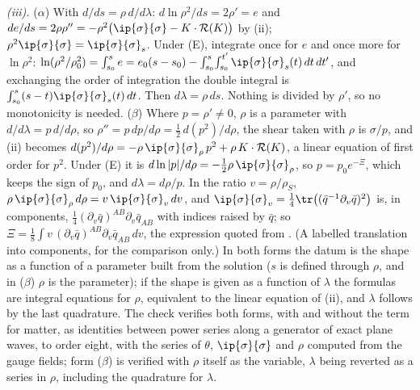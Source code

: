 \emph{(iii).} ($\alpha$) With $d/ds = \rho\,d/d\lambda$: $d\ln\rho^{2}/ds = 2\rho' = e$ and $de/ds = 2\rho\rho'' = -\rho^{2}\bigl(\ip{\sigma}{\sigma} - K \cdot \mathcal{R}(K)\bigr)$ by (ii); $\rho^{2}\ip{\sigma}{\sigma} = \ip{\sigma}{\sigma}_{s}$. Under (E), integrate once for $e$ and once more for $\ln\rho^{2}$: $\ln(\rho^{2}/\rho_{0}^{2}) = \int_{s_{0}}^{s}e = e_{0}(s - s_{0}) - \int_{s_{0}}^{s}\!\int_{s_{0}}^{t'}\ip{\sigma}{\sigma}_{s}(t)\,dt\,dt'$, and exchanging the order of integration the double integral is $\int_{s_{0}}^{s}(s - t)\ip{\sigma}{\sigma}_{s}(t)\,dt$. Then $d\lambda = \rho\,ds$. Nothing is divided by $\rho'$, so no monotonicity is needed. ($\beta$) Where $p = \rho' \neq 0$, $\rho$ is a parameter with $d/d\lambda = p\,d/d\rho$, so $\rho'' = p\,dp/d\rho = \tfrac12\,d(p^{2})/d\rho$, the shear taken with $\rho$ is $\sigma/p$, and (ii) becomes $d(p^{2})/d\rho = -\rho\,\ip{\sigma}{\sigma}_{\rho}\,p^{2} + \rho\,K \cdot \mathcal{R}(K)$, a linear equation of first order for $p^{2}$. Under (E) it is $d\ln|p|/d\rho = -\tfrac12\rho\,\ip{\sigma}{\sigma}_{\rho}$, so $p = p_{0}e^{-\Xi}$, which keeps the sign of $p_{0}$, and $d\lambda = d\rho/p$. In the ratio $v = \rho/\rho_{S}$, $\rho\,\ip{\sigma}{\sigma}_{\rho}\,d\rho = v\,\ip{\sigma}{\sigma}_{v}\,dv$, and $\ip{\sigma}{\sigma}_{v} = \tfrac14\tr\bigl((\bar q^{-1}\partial_{v}\bar q)^{2}\bigr)$ is, in components, $\tfrac14(\partial_{v}\bar q)^{AB}\partial_{v}\bar q_{AB}$ with indices raised by $\bar q$; so $\Xi = \tfrac18\int v\,(\partial_{v}\bar q)^{AB}\partial_{v}\bar q_{AB}\,dv$, the expression quoted from \cite{Chandrasekaran2026}. (A labelled translation into components, for the comparison only.) In both forms the datum is the shape as a function of a parameter built from the solution ($s$ is defined through $\rho$, and in ($\beta$) $\rho$ is the parameter); if the shape is given as a function of $\lambda$ the formulas are integral equations for $\rho$, equivalent to the linear equation of (ii), and $\lambda$ follows by the last quadrature. The check verifies both forms, with and without the term for matter, as identities between power series along a generator of exact plane waves, to order eight, with the series of $\theta$, $\ip{\sigma}{\sigma}$ and $\rho$ computed from the gauge fields; form ($\beta$) is verified with $\rho$ itself as the variable, $\lambda$ being reverted as a series in $\rho$, including the quadrature for $\lambda$.

